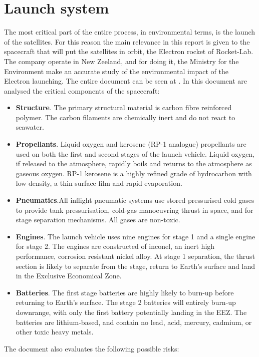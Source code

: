 \section{Launch system}
The most critical part of the entire process, in environmental terms, is the launch of the satellites. For this reason the main relevance in this report is given to the spacecraft that will put the satellites in orbit, the Electron rocket of Rocket-Lab.
The company operate in New Zeeland, and for doing it, the Ministry for the Environment make an accurate study of the environmental impact of the Electron launching. The entire document can be seen at \cite{EIS}.
In this document are analysed the critical components of the spacecraft:
\begin{itemize}
\item \textbf{Structure}. The primary structural material is carbon fibre reinforced polymer. The carbon filaments are chemically inert and do not react to seawater.
\item \textbf{Propellants}. Liquid oxygen and kerosene (RP-1 analogue) propellants are used on both the first and second stages of the launch vehicle. Liquid oxygen, if released to the atmosphere, rapidly boils and returns to the atmosphere as gaseous oxygen. RP-1 kerosene is a highly refined grade of hydrocarbon with low density, a thin surface film and rapid evaporation.
\item \textbf{Pneumatics}.All inflight pneumatic systems use stored pressurised cold gases to provide tank pressurisation, cold-gas manoeuvring thrust in space, and for stage separation mechanisms. All gases are non-toxic.
\item \textbf{Engines}. The launch vehicle uses nine engines for stage 1 and a single engine for stage 2. The engines are constructed of inconel, an inert high performance, corrosion resistant nickel alloy. At stage 1 separation, the thrust section is likely to separate from the stage, return to Earth’s surface and land in the Exclusive Economical Zone.
\item \textbf{Batteries}. The first stage batteries are highly likely to burn-up before returning to Earth’s surface. The stage 2 batteries will entirely burn-up downrange, with only the first battery potentially landing in the EEZ. The batteries are lithium-based, and contain no lead, acid, mercury, cadmium, or other toxic heavy metals.
\end{itemize}
The document also evaluates the following possible risks:
